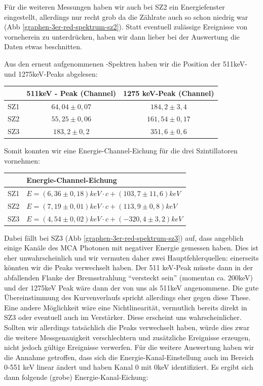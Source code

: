 Für die weiteren Messungen haben wir auch bei SZ2 ein Energiefenster eingestellt, allerdings nur recht grob da die Zählrate auch so schon niedrig war (Abb \ref{graphen-3er-red-spektrum-sz2}). Statt eventuell zulässige Ereignisse von vorneherein zu unterdrücken, haben wir dann lieber bei der Auswertung die Daten etwas beschnitten.

Aus den erneut aufgenommenen \Na-Spektren haben wir die Position der 511keV- und 1275keV-Peaks abgelesen:  
\begin{center}
\begin{tabular}{lcc}
\toprule
 & 511keV - Peak (Channel) & 1275 keV-Peak (Channel) \\
\midrule
SZ1 & $64,04 \pm 0,07$ & $184,2 \pm 3,4$ \\
SZ2 & $55,25 \pm 0,06$ & $161,54 \pm 0,17$ \\
SZ3 & $183,2 \pm 0,2$ & $351,6 \pm 0,6$ \\
\bottomrule 
\end{tabular}
\end{center}

Somit konnten wir eine Energie-Channel-Eichung für die drei Szintillatoren vornehmen:

\begin{center}
\begin{tabular}{ll}
\toprule
     & Energie-Channel-Eichung\\
\midrule
 SZ1 & $E = (6,36 \pm 0,18) keV \cdot c + (103,7 \pm 11,6) keV$\\
 SZ2 & $E = (7,19 \pm 0,01) keV \cdot c + (113,9 \pm 0,8) keV$\\
 SZ3 & $E = (4,54 \pm 0,02) keV \cdot c + (-320,4 \pm 3,2) keV$\\
\bottomrule 
\end{tabular}
\end{center}

Dabei fällt bei SZ3 (Abb \ref{graphen-3er-red-spektrum-sz3}) auf, dass angeblich einige Kanäle des MCA Photonen mit negativer Energie gemessen haben. Dies ist eher unwahrscheinlich und wir vermuten daher zwei Hauptfehlerquellen: einerseits könnten wir die Peaks verwechselt haben. Der 511 keV-Peak müsste dann in der abfallenden Flanke der Bremsstrahlung "`versteckt sein"' (momentan ca. 200keV) und der 1275keV Peak wäre dann der von uns als 511keV angenommene. Die gute Übereinstimmung des Kurvenverlaufs spricht allerdings eher gegen diese These. Eine andere Möglichkeit wäre eine Nichtlinearität, vermutlich bereits direkt in SZ3 oder eventuell auch im Verstärker. Diese erscheint uns wahrscheinlicher. Sollten wir allerdings tatsächlich die Peaks verwechselt haben, würde dies zwar die weitere Messgenauigkeit verschlechtern und zusätzliche Ereignisse erzeugen, nicht jedoch gültige Ereignisse verwerfen. Für die weitere Auswertung haben wir die Annahme getroffen, dass sich die Energie-Kanal-Einstellung auch im Bereich 0-551 keV linear ändert und haben Kanal 0 mit 0keV identifiziert. Es ergibt sich dann folgende (grobe) Energie-Kanal-Eichung:

